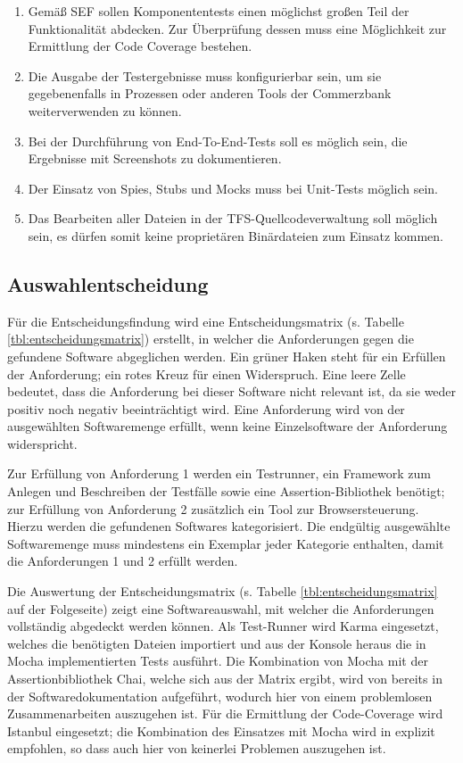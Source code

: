 \begin{enumerate}
	\item Gemäß SEF sollen Komponententests \glqq einen möglichst großen Teil der Funktionalität abdecken\grqq{}\cite{coba-sef}. Zur Überprüfung dessen muss eine Möglichkeit zur Ermittlung der Code Coverage bestehen.
	\item Die Ausgabe der Testergebnisse muss konfigurierbar sein, um sie gegebenenfalls in Prozessen oder anderen Tools der Commerzbank weiterverwenden zu können.
	\item Bei der Durchführung von End-To-End-Tests soll es möglich sein, die Ergebnisse mit Screenshots zu dokumentieren.
	\item Der Einsatz von Spies, Stubs und Mocks muss bei Unit-Tests möglich sein.
	\item Das Bearbeiten aller Dateien in der TFS-Quellcodeverwaltung soll möglich sein, es dürfen somit keine proprietären Binärdateien zum Einsatz kommen.
\end{enumerate}

\newpage


\newpage
\subsection{Auswahlentscheidung}
Für die Entscheidungsfindung wird eine Entscheidungsmatrix (s. Tabelle \ref{tbl:entscheidungsmatrix}) erstellt, in welcher die Anforderungen gegen die gefundene Software abgeglichen werden. Ein grüner Haken steht für ein Erfüllen der Anforderung; ein rotes Kreuz für einen Widerspruch. Eine leere Zelle bedeutet, dass die Anforderung bei dieser Software nicht relevant ist, da sie weder positiv noch negativ beeinträchtigt wird. Eine Anforderung wird von der ausgewählten Softwaremenge erfüllt, wenn keine Einzelsoftware der Anforderung widerspricht.

Zur Erfüllung von Anforderung 1 werden ein Testrunner, ein Framework zum Anlegen und Beschreiben der Testfälle sowie eine Assertion-Bibliothek benötigt; zur Erfüllung von Anforderung 2 zusätzlich ein Tool zur Browsersteuerung. Hierzu werden die gefundenen Softwares  kategorisiert. Die endgültig ausgewählte Softwaremenge muss mindestens ein Exemplar jeder Kategorie enthalten, damit die Anforderungen 1 und 2 erfüllt werden.

Die Auswertung der Entscheidungsmatrix (s. Tabelle \ref{tbl:entscheidungsmatrix} auf der Folgeseite) zeigt eine Softwareauswahl, mit welcher die Anforderungen vollständig abgedeckt werden können. Als Test-Runner wird Karma eingesetzt, welches die benötigten Dateien importiert und aus der Konsole heraus die in Mocha implementierten Tests ausführt. Die Kombination von Mocha mit der Assertionbibliothek Chai, welche sich aus der Matrix ergibt, wird von \textcite{mocha-index} bereits in der Softwaredokumentation aufgeführt, wodurch hier von einem problemlosen Zusammenarbeiten auszugehen ist. Für die Ermittlung der Code-Coverage wird Istanbul eingesetzt; die Kombination des Einsatzes mit Mocha wird in \cite{istanbul} explizit empfohlen, so dass auch hier von keinerlei Problemen auszugehen ist.

